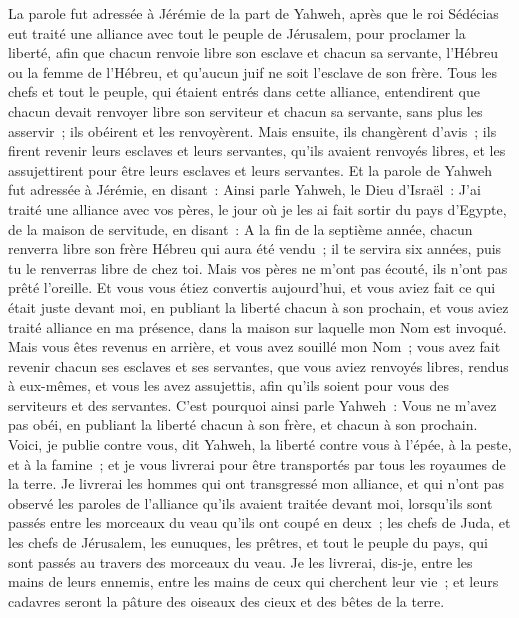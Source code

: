 \begin{multicols}{2}
La parole fut adressée à Jérémie de la part de Yahweh, après que le roi Sédécias eut traité une alliance avec tout le peuple de Jérusalem, pour proclamer la liberté,
afin que chacun renvoie libre son esclave et chacun sa servante, l'Hébreu ou la femme de l'Hébreu, et qu'aucun juif ne soit l'esclave de son frère.
Tous les chefs et tout le peuple, qui étaient entrés dans cette alliance, entendirent que chacun devait renvoyer libre son serviteur et chacun sa servante, sans plus les asservir~; ils obéirent et les renvoyèrent.
Mais ensuite, ils changèrent d'avis~; ils firent revenir leurs esclaves et leurs servantes, qu'ils avaient renvoyés libres, et les assujettirent pour être leurs esclaves et leurs servantes.
Et la parole de Yahweh fut adressée à Jérémie, en disant~:
Ainsi parle Yahweh, le Dieu d'Israël~: J'ai traité une alliance avec vos pères, le jour où je les ai fait sortir du pays d'Egypte, de la maison de servitude, en disant~:
A la fin de la septième année, chacun renverra libre son frère Hébreu qui aura été vendu~; il te servira six années, puis tu le renverras libre de chez toi. Mais vos pères ne m'ont pas écouté, ils n'ont pas prêté l'oreille.
Et vous vous étiez convertis aujourd'hui, et vous aviez fait ce qui était juste devant moi, en publiant la liberté chacun à son prochain, et vous aviez traité alliance en ma présence, dans la maison sur laquelle mon Nom est invoqué.
Mais vous êtes revenus en arrière, et vous avez souillé mon Nom~; vous avez fait revenir chacun ses esclaves et ses servantes, que vous aviez renvoyés libres, rendus à eux-mêmes, et vous les avez assujettis, afin qu'ils soient pour vous des serviteurs et des servantes.
C'est pourquoi ainsi parle Yahweh~: Vous ne m'avez pas obéi, en publiant la liberté chacun à son frère, et chacun à son prochain. Voici, je publie contre vous, dit Yahweh, la liberté contre vous à l'épée, à la peste, et à la famine~; et je vous livrerai pour être transportés par tous les royaumes de la terre.
Je livrerai les hommes qui ont transgressé mon alliance, et qui n'ont pas observé les paroles de l'alliance qu'ils avaient traitée devant moi, lorsqu'ils sont passés entre les morceaux du veau qu'ils ont coupé en deux~;
les chefs de Juda, et les chefs de Jérusalem, les eunuques, les prêtres, et tout le peuple du pays, qui sont passés au travers des morceaux du veau.
Je les livrerai, dis-je, entre les mains de leurs ennemis, entre les mains de ceux qui cherchent leur vie~; et leurs cadavres seront la pâture des oiseaux des cieux et des bêtes de la terre.

\end{multicols}
